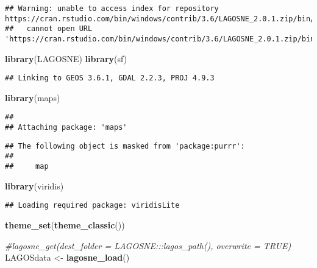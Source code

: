 \documentclass[]{article}
\newenvironment{Shaded}{\begin{snugshade}}{\end{snugshade}}
\newcommand{\CommentTok}[1]{\textcolor[rgb]{0.56,0.35,0.01}{\textit{#1}}}
\newcommand{\KeywordTok}[1]{\textcolor[rgb]{0.13,0.29,0.53}{\textbf{#1}}}
\newcommand{\NormalTok}[1]{#1}
\newcommand{\StringTok}[1]{\textcolor[rgb]{0.31,0.60,0.02}{#1}}
\begin{document}
\begin{verbatim}
## Warning: unable to access index for repository https://cran.rstudio.com/bin/windows/contrib/3.6/LAGOSNE_2.0.1.zip/bin/windows/contrib/3.6:
##   cannot open URL 'https://cran.rstudio.com/bin/windows/contrib/3.6/LAGOSNE_2.0.1.zip/bin/windows/contrib/3.6/PACKAGES'
\end{verbatim}

\begin{Shaded}
\begin{Highlighting}[]
\KeywordTok{library}\NormalTok{(LAGOSNE)}
\KeywordTok{library}\NormalTok{(sf)}
\end{Highlighting}
\end{Shaded}

\begin{verbatim}
## Linking to GEOS 3.6.1, GDAL 2.2.3, PROJ 4.9.3
\end{verbatim}

\begin{Shaded}
\begin{Highlighting}[]
\KeywordTok{library}\NormalTok{(maps)}
\end{Highlighting}
\end{Shaded}

\begin{verbatim}
## 
## Attaching package: 'maps'
\end{verbatim}

\begin{verbatim}
## The following object is masked from 'package:purrr':
## 
##     map
\end{verbatim}

\begin{Shaded}
\begin{Highlighting}[]
\KeywordTok{library}\NormalTok{(viridis)}
\end{Highlighting}
\end{Shaded}

\begin{verbatim}
## Loading required package: viridisLite
\end{verbatim}

\begin{Shaded}
\begin{Highlighting}[]
\KeywordTok{theme_set}\NormalTok{(}\KeywordTok{theme_classic}\NormalTok{())}

\CommentTok{#lagosne_get(dest_folder = LAGOSNE:::lagos_path(), overwrite = TRUE)}
\NormalTok{LAGOSdata <-}\StringTok{ }\KeywordTok{lagosne_load}\NormalTok{()}
\end{Highlighting}
\end{Shaded}
\end{document}
